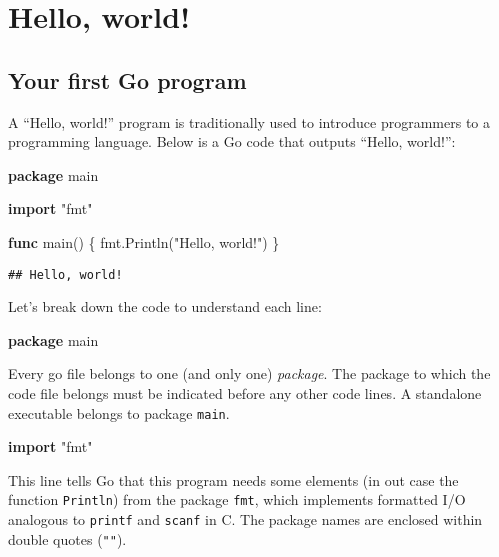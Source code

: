 \documentclass[]{book}
\newenvironment{Shaded}{\begin{snugshade}}{\end{snugshade}}
\newcommand{\KeywordTok}[1]{\textcolor[rgb]{0.13,0.29,0.53}{\textbf{#1}}}
\newcommand{\NormalTok}[1]{#1}
\newcommand{\StringTok}[1]{\textcolor[rgb]{0.31,0.60,0.02}{#1}}
\begin{document}
\hypertarget{hello-world}{%
\section{Hello, world!}\label{hello-world}}

\hypertarget{your-first-go-program}{%
\subsection{Your first Go program}\label{your-first-go-program}}

A ``Hello, world!'' program is traditionally used to introduce programmers to a programming language. Below is a Go code that outputs ``Hello, world!'':

\begin{Shaded}
\begin{Highlighting}[]
\KeywordTok{package}\NormalTok{ main}

\KeywordTok{import} \StringTok{"fmt"}

\KeywordTok{func}\NormalTok{ main() \{}
\NormalTok{    fmt.Println(}\StringTok{"Hello, world!"}\NormalTok{)}
\NormalTok{\}}
\end{Highlighting}
\end{Shaded}

\begin{verbatim}
## Hello, world!
\end{verbatim}

Let's break down the code to understand each line:

\begin{Shaded}
\begin{Highlighting}[]
\KeywordTok{package}\NormalTok{ main}
\end{Highlighting}
\end{Shaded}

Every go file belongs to one (and only one) \emph{package}. The package to which the code file belongs must be indicated before any other code lines. A standalone executable belongs to package \texttt{main}.

\begin{Shaded}
\begin{Highlighting}[]
\KeywordTok{import} \StringTok{"fmt"}
\end{Highlighting}
\end{Shaded}

This line tells Go that this program needs some elements (in out case the
function \texttt{Println}) from the package \texttt{fmt}, which implements formatted I/O
analogous to \texttt{printf} and \texttt{scanf} in C. The package names are enclosed within
double quotes (\texttt{""}).
\end{document}
